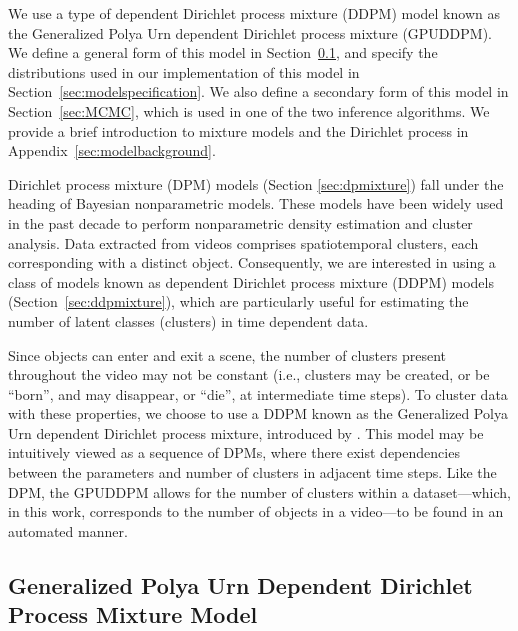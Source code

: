 \documentclass[twocolumn, final]{svjour3}
\begin{document}
We use a type of dependent Dirichlet process mixture (DDPM) model known as the Generalized Polya Urn dependent Dirichlet process mixture (GPUDDPM). We define a general form of this model in Section~\ref{sec:gpuddpm}, and specify the distributions used in our implementation of this model in Section~\ref{sec:modelspecification}. We also define a secondary form of this model in Section~\ref{sec:MCMC}, which is used in one of the two inference algorithms. We provide a brief introduction to mixture models and the Dirichlet process in Appendix~\ref{sec:modelbackground}.

Dirichlet process mixture (DPM) models (Section \ref{sec:dpmixture}) fall under the heading of Bayesian nonparametric models. These models have been widely used in the past decade to perform nonparametric density estimation and cluster analysis. Data extracted from videos comprises spatiotemporal clusters, each corresponding with a distinct object. Consequently, we are interested in using a class of models known as dependent Dirichlet process mixture (DDPM) models (Section~\ref{sec:ddpmixture}), which are particularly useful for estimating the number of latent classes (clusters) in time dependent data. 

Since objects can enter and exit a scene, the number of clusters present throughout the video may not be constant (i.e., clusters may be created, or be ``born'', and may disappear, or ``die'', at intermediate time steps). To cluster data with these properties, we choose to use a DDPM known as the Generalized Polya Urn dependent Dirichlet process mixture, introduced by \cite{caron_2007}. This model may be intuitively viewed as a sequence of DPMs, where there exist dependencies between the parameters and number of clusters in adjacent time steps. Like the DPM, the GPUDDPM allows for the number of clusters within a dataset---which, in this work, corresponds to the number of objects in a video---to be found in an automated manner.



\subsection{Generalized Polya Urn Dependent Dirichlet Process Mixture Model}
\label{sec:gpuddpm}
\end{document}

